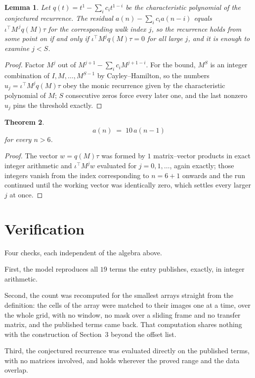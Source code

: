 \documentclass[11pt,a4paper]{article}
\theoremstyle{plain}
\newtheorem{theorem}{Theorem}
\newtheorem{lemma}[theorem]{Lemma}
\theoremstyle{definition}
\begin{document}
\begin{lemma}\label{lem:crit}
Let $q(t)=t^{1}-\sum_i c_it^{1-i}$ be the characteristic polynomial of the
conjectured recurrence. The residual $a(n)-\sum_ic_ia(n-i)$ equals
$\iota^{\!\top}M^{\,j}q(M)\tau$ for the corresponding walk index $j$, so the recurrence
holds from some point on if and only if $\iota^{\!\top}M^{j}q(M)\tau=0$ for all large $j$,
and it is enough to examine $j<S$.
\end{lemma}

\begin{proof}
Factor $M^{j}$ out of $M^{j+1}-\sum_ic_iM^{j+1-i}$. For the bound, $M^{S}$
is an integer combination of $I,M,\dots,M^{S-1}$ by Cayley--Hamilton, so the numbers
$u_j=\iota^{\!\top}M^{j}q(M)\tau$ obey the monic recurrence given by the characteristic
polynomial of $M$; $S$ consecutive zeros force every later one, and the last nonzero $u_j$
pins the threshold exactly.
\end{proof}

\begin{theorem}
\[
a(n)\;=\;10\,a(n-1)
\]
for every $n>6$.
\end{theorem}

\begin{proof}
The vector $w=q(M)\tau$ was formed by $1$ matrix--vector products in exact integer
arithmetic and $\iota^{\!\top}M^{j}w$ evaluated for $j=0,1,\dots$, again exactly; those
integers vanish from the index corresponding to $n=6+1$ onwards and the run continued
until the working vector was identically zero, which settles every larger $j$ at once.
\end{proof}

\section{Verification}

Four checks, each independent of the algebra above.

First, the model reproduces all $19$ terms the entry publishes, exactly, in integer
arithmetic.

Second, the count was recomputed for the smallest arrays straight from the definition: the
cells of the array were matched to their images one at a time, over the whole grid, with no
window, no mask over a sliding frame and no transfer matrix, and the published terms came back.
That computation shares nothing with the construction of Section~3 beyond the offset list.

Third, the conjectured recurrence was evaluated directly on the published terms, with no
matrices involved, and holds wherever the proved range and the data overlap.
\end{document}

